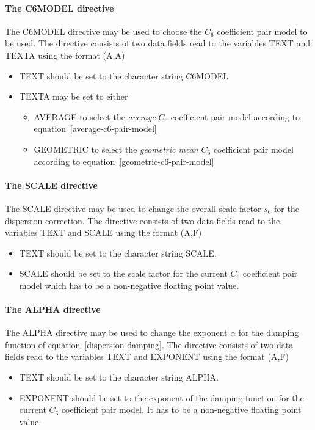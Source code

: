 \documentclass[11pt,fleqn]{article}
\begin{document}
\paragraph{The C6MODEL directive}

The C6MODEL directive may be used to choose the $C_6$ coefficient pair model
to be used. The directive consists of two data fields read to the variables
TEXT and TEXTA using the format (A,A)
\begin{itemize}
\item TEXT should be set to the character string C6MODEL
\item TEXTA may be set to either
      \begin{itemize}
      \item AVERAGE to select the {\em average} $C_6$ coefficient pair model
            according to equation~\ref{average-c6-pair-model}
      \item GEOMETRIC to select the {\em geometric mean} $C_6$ coefficient pair
            model according to equation~\ref{geometric-c6-pair-model}
      \end{itemize}
\end{itemize}

\paragraph{The SCALE directive}

The SCALE directive may be used to change the overall scale factor $s_6$ for
the dispersion correction. The directive consists of two data fields read
to the variables TEXT and SCALE using the format (A,F)
\begin{itemize}
\item TEXT should be set to the character string SCALE.
\item SCALE should be set to the scale factor for the current $C_6$ coefficient
      pair model which has to be a non-negative floating point value.
\end{itemize}

\paragraph{The ALPHA directive}

The ALPHA directive may be used to change the exponent $\alpha$ for
the damping function of equation~\ref{dispersion-damping}. The directive
consists of two data fields read to the variables TEXT and EXPONENT using the
format (A,F)
\begin{itemize}
\item TEXT should be set to the character string ALPHA.
\item EXPONENT should be set to the exponent of the damping function for the
      current $C_6$ coefficient pair model. It has to be a non-negative
      floating point value.
\end{itemize}
\end{document}
